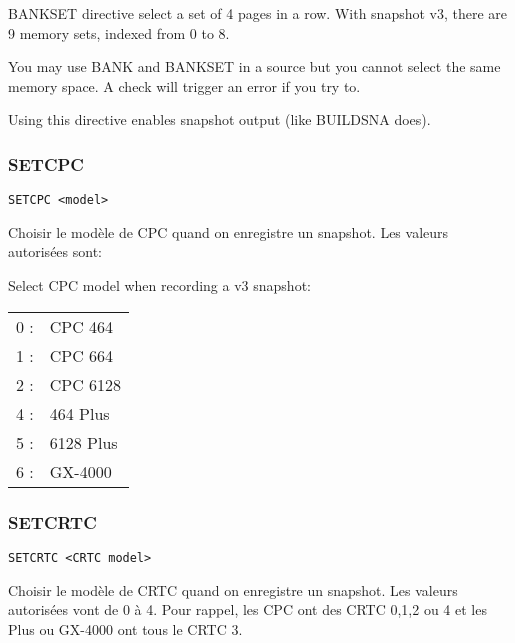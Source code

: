 \begin{xen}
BANKSET directive select a set of 4 pages in a row. With snapshot v3, there are 9 memory sets, indexed from 0 to 8.

You may use BANK and BANKSET in a source but you cannot select the same memory space. A check will trigger an error if you try to.

Using this directive enables snapshot output (like BUILDSNA does).
\end{xen}


\subsubsection{SETCPC}

\begin{verbatim}
SETCPC <model>
\end{verbatim}

\begin{xfr}
Choisir le modèle de CPC quand on enregistre un snapshot. Les valeurs autorisées sont:
\end{xfr}

\begin{xen}
Select CPC model when recording a v3 snapshot:
\end{xen}

\begin{tabular}{ll}
0 :& CPC 464 \\
1 :& CPC 664 \\
2 :& CPC 6128 \\
4 :& 464 Plus \\
5 :& 6128 Plus \\
6 :& GX-4000 \\
\end{tabular}

\subsubsection{SETCRTC}

\begin{verbatim}
SETCRTC <CRTC model>
\end{verbatim}

\begin{xfr}
Choisir le modèle de CRTC quand on enregistre un snapshot. Les valeurs autorisées vont de 0 à 4. Pour rappel, les CPC ont des CRTC 0,1,2 ou 4 et les Plus ou GX-4000 ont tous le CRTC 3.
\end{xfr}

